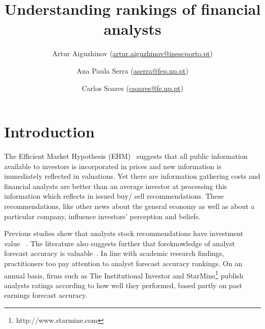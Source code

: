 \documentclass[12pt,a4paper]{article}\usepackage[]{graphicx}\usepackage[]{color}
\begin{document}



\title{Understanding rankings of financial analysts}
 \author[1,2]{ Artur Aiguzhinov (\href{mailto:artur.aiguzhinov@inescporto.pt}{artur.aiguzhinov@inescporto.pt})}
 \author[1]{ Ana Paula Serra (\href{mailto:aserra@fep.up.pt}{aserra@fep.up.pt})}
 \author[2,3]{Carlos Soares (\href{mailto:csoares@fe.up.pt}{csoares@fe.up.pt})}



\maketitle
\begin{abstract}

\end{abstract}
\doublespace






\section{Introduction}
\label{ch3-sec:introduction}

The Efficient Market Hypothesis (EHM)~\citep{fama1970ecm} suggests that all public information available to investors is incorporated in prices and new information is immediately reflected in valuations. Yet there are information gathering costs and financial analysts are better than an average investor at processing this information which reflects in issued buy/ sell recommendations. These recommendations, like other news about the general economy as well as about a particular company, influence investors' perception and beliefs.

Previous studies show that analysts stock recommendations have investment value ~\citep{womack1996,barber2001}. The literature also suggests further that foreknowledge of analyst forecast accuracy is valuable~\citep{brown2003,aiguzhinov2015a}. In line with academic research findings, practitioners too pay attention to analyst forecast accuracy rankings. On an annual basis, firms such as The Institutional Investor and StarMine\footnote{http://www.starmine.com} publish analysts ratings according to how well they performed, based partly on past earnings forecast accuracy.
\end{document}
